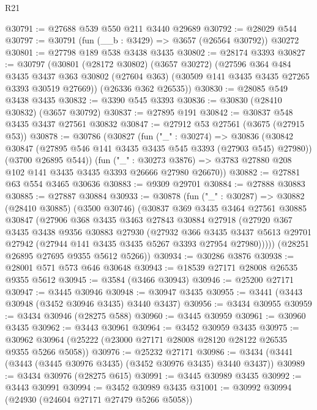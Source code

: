 \begin{lexlean}{R21}
\begin{coremodule}
@30791 := @27688 @539 @550 @211 @3440 @29689
@30792 := @28029 @544
@30797 := @30791 (fun (__b : @3429) => @3657 (@26564 @30792)) @30272
@30801 := @27798 @189 @538 @3438 @3435
@30802 := @28174 @3393
@30827 := @30797
    (@30801
      (@28172 @30802)
      (@3657 @30272)
      (@27596
        @364
        @484
        @3435
        @3437
        @363
        @30802
        (@27604 @363)
        (@30509 @141 @3435 @3435 @27265 @3393 @30519 @27669))
      (@26336 @362 @26535))
@30830 := @28085 @549 @3438 @3435
@30832 := @3390 @545 @3393
@30836 := @30830 (@28410 @30832) (@3657 @30792)
@30837 := @27895 @191
@30842 := @30837 @548 @3435 @3437 @27561 @30832
@30847 := @27912 @53 @27561 (@3675 (@27915 @53))
@30878 := @30786
    (@30827
      (fun ("_" : @30274) =>
      @30836
        (@30842 @30847 (@27895 @546 @141 @3435 @3435 @545 @3393 (@27903 @545) @27980))
        (@3700 @26895 @544))
      (fun ("_" : @30273 @3876) =>
      @3783 @27880 @208 @102 @141 @3435 @3435 @3393 @26666 @27980 @26670))
@30882 := @27881 @63 @554 @3465 @30636
@30883 := @9309 @29701
@30884 := @27888 @30883
@30885 := @27887 @30884
@30933 := @30878
    (fun ("_" : @30287) =>
    @30882
      (@28410 @30885)
      (@3500 @30746)
      (@30837
        @369
        @3435
        @3464
        @27561
        @30885
        @30847
        (@27906
          @368
          @3435
          @3463
          @27843
          @30884
          @27918
          (@27920
            @367
            @3435
            @3438
            @9356
            @30883
            @27930
            (@27932
              @366
              @3435
              @3437
              @5613
              @29701
              @27942
              (@27944 @141 @3435 @3435 @5267 @3393 @27954 @27980)))))
      (@28251 @26895 @27695 @9355 @5612 @5266))
@30934 := @30286 @3876
@30938 := @28001 @571 @573 @646 @30648
@30943 := @18539 @27171 @28008 @26535 @9355 @5612
@30945 := @3584 (@3466 @30943)
@30946 := @25200 @27171
@30947 := @3445 @30946
@30948 := @30947 @3435
@30955 := @3441 (@3443 @30948 (@3452 @30946 @3435) @3440 @3437)
@30956 := @3434 @30955
@30959 := @3434 @30946 (@28275 @588)
@30960 := @3445 @30959
@30961 := @30960 @3435
@30962 := @3443 @30961
@30964 := @3452 @30959 @3435
@30975 := @30962 @30964 (@25222 (@23000 @27171 @28008 @28120 @28122 @26535 @9355 @5266 @5058))
@30976 := @25232 @27171
@30986 := @3434 (@3441 (@3443 (@3445 @30976 @3435) (@3452 @30976 @3435) @3440 @3437))
@30989 := @3434 @30976 (@28275 @615)
@30991 := @3445 @30989 @3435
@30992 := @3443 @30991
@30994 := @3452 @30989 @3435
@31001 := @30992 @30994 (@24930 (@24604 @27171 @27479 @5266 @5058))

\end{coremodule}
\end{lexlean}
